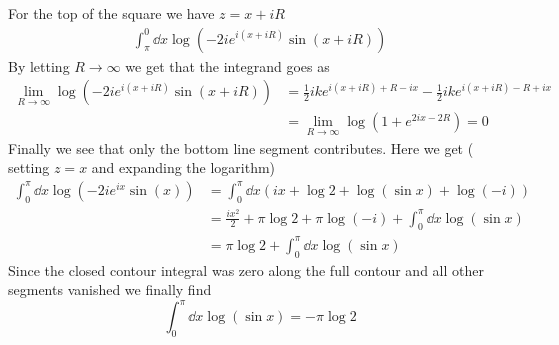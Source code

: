 \documentclass[a4paper,12pt]{article}
\begin{document}
For the top of the square we have $z=x+iR$
\begin{equation}
\begin{aligned}
\int_{\pi}^{0}\dd x\log(-2ie^{i(x+iR)}\sin (x+iR))
\end{aligned}
\end{equation}
By letting $R\to\infty$ we get that the integrand goes as
\begin{equation}
	\begin{aligned}
\lim_{R\to\infty}\log(-2ie^{i(x+iR)}\sin (x+iR))&=\frac{1}{2} i k e^{i (x+i R)+R-i x}-\frac{1}{2} i k e^{i (x+i R)-R+i x}\\
&=\lim_{R\to\infty} \log(1+e^{2ix-2R})=0
	\end{aligned}
\end{equation}
Finally we see that only the bottom line segment contributes. Here we get ( setting $z=x$ and expanding the logarithm)
\begin{equation}
	\begin{aligned}
		\int^{\pi}_{0}\dd x\log(-2ie^{ix}\sin (x))&=	\int^{\pi}_{0}\dd x \left(ix+\log 2+\log (\sin x)+\log(-i)\right)\\
		&=	\frac{ix^2}{2}+\pi\log 2+\pi\log(-i)+\int^{\pi}_{0}\dd x \log (\sin x)\\
				&=\pi\log 2+\int^{\pi}_{0}\dd x \log (\sin x)
	\end{aligned}
\end{equation}
Since the closed contour integral was zero along the full contour and all other segments vanished we finally find
\begin{equation}
\int^{\pi}_{0}\dd x \log (\sin x)=-\pi\log 2
\end{equation}
\end{document}
